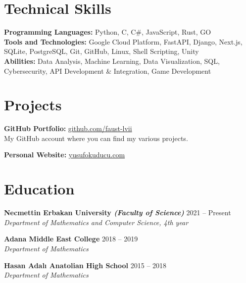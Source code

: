 \documentclass[10pt,a4paper]{extarticle}
\begin{document}
\section{Technical Skills}
\textbf{Programming Languages:} Python, C, C\#, JavaScript, Rust, GO\\
\textbf{Tools and Technologies:} Google Cloud Platform, FastAPI, Django, Next.js, SQLite, PostgreSQL, Git, GitHub, Linux, Shell Scripting, Unity\\
\textbf{Abilities:} Data Analysis, Machine Learning, Data Visualization, SQL, Cybersecurity, API Development \& Integration, Game Development

\vspace{10pt}

\section{Projects}
\textbf{GitHub Portfolio:} \href{https://github.com/faust-lvii}{github.com/faust-lvii}\\
My GitHub account where you can find my various projects.

\vspace{5pt}

\textbf{Personal Website:} \href{https://yusufokuducu.com}{yusufokuducu.com}

\vspace{10pt}

\section{Education}
\textbf{Necmettin Erbakan University \textit{(Faculty of Science)}} \hfill 2021 -- Present\\
\textit{Department of Mathematics and Computer Science, 4th year}

\vspace{5pt}

\textbf{Adana Middle East College} \hfill 2018 -- 2019\\
\textit{Department of Mathematics}

\vspace{5pt}

\textbf{Hasan Adalı Anatolian High School} \hfill 2015 -- 2018\\
\textit{Department of Mathematics}
\end{document}
